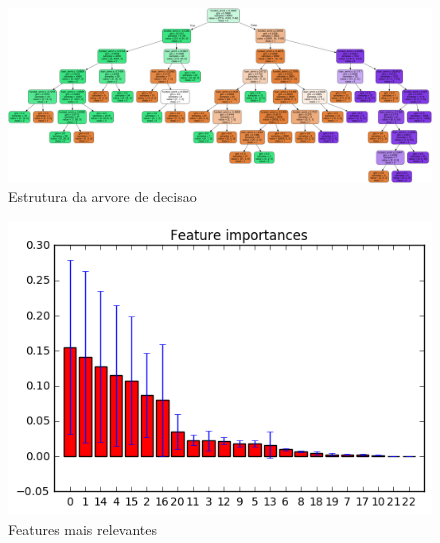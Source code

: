 \begin{figure}[!ht]
\caption{Estrutura da arvore de decisao}
\centerline{\includegraphics[width=1.05\textwidth]{img/loan}}
\end{figure}


\begin{figure}[!ht]
\caption{Features mais relevantes}
\centerline{\includegraphics[width=.7\textwidth]{img/tree-most-important-features}}
\end{figure}






